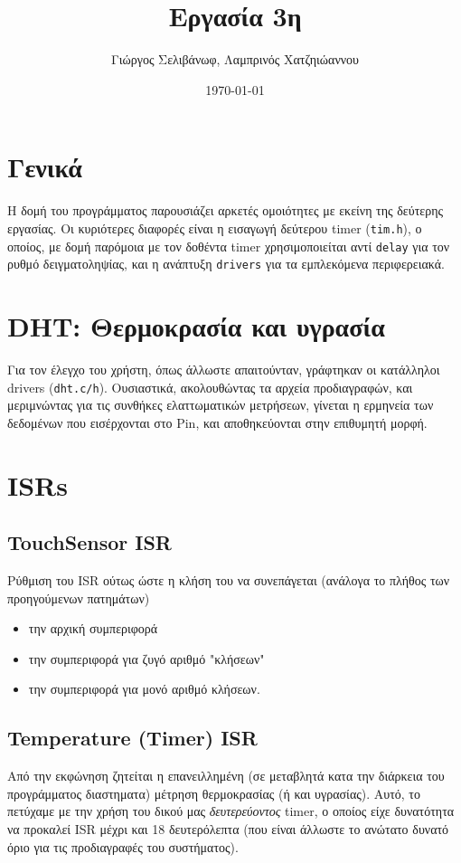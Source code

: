 \documentclass[11pt]{article}
\author{Γιώργος Σελιβάνωφ, Λαμπρινός Χατζηιώαννου}
\date{\today}
\title{Εργασία 3η}
\begin{document}
\maketitle
\section{Γενικά}
\label{sec:org1d7ea7e}
Η δομή του προγράμματος παρουσιάζει αρκετές ομοιότητες με εκείνη της
δεύτερης εργασίας. Οι κυριότερες διαφορές είναι η εισαγωγή δεύτερου
timer (\texttt{tim.h}), ο οποίος, με δομή παρόμοια με τον δοθέντα timer
χρησιμοποιείται αντί \texttt{delay} για τον ρυθμό δειγματοληψίας, και η
ανάπτυξη \texttt{drivers} για τα εμπλεκόμενα περιφερειακά.
\section{DHT: Θερμοκρασία και υγρασία}
\label{sec:org25f0554}
Για τον έλεγχο του χρήστη, όπως άλλωστε απαιτούνταν, γράφτηκαν οι
κατάλληλοι drivers (\texttt{dht.c/h}).  Ουσιαστικά, ακολουθώντας τα αρχεία
προδιαγραφών, και μεριμνώντας για τις συνθήκες ελαττωματικών
μετρήσεων, γίνεται η ερμηνεία των δεδομένων που εισέρχονται στο Pin,
και αποθηκεύονται στην επιθυμητή μορφή.
\section{ISRs}
\label{sec:org81a3a92}
\subsection{TouchSensor ISR}
\label{sec:orga41356c}
Ρύθμιση του ISR ούτως ώστε η κλήση του να συνεπάγεται (ανάλογα το
πλήθος των προηγούμενων πατημάτων)
\begin{itemize}
\item την αρχική συμπεριφορά
\item την συμπεριφορά για ζυγό αριθμό "κλήσεων"
\item την συμπεριφορά για μονό αριθμό κλήσεων.
\end{itemize}
\subsection{Temperature (Timer) ISR}
\label{sec:org4ea5fde}
Από την εκφώνηση ζητείται η επανειλλημένη (σε μεταβλητά κατα την
διάρκεια του προγράμματος διαστηματα) μέτρηση θερμοκρασίας (ή και
υγρασίας). Αυτό, το πετύχαμε με την χρήση του δικού μας \emph{δευτερεύοντος}
timer, ο οποίος είχε δυνατότητα να προκαλεί ISR μέχρι και 18
δευτερόλεπτα (που είναι άλλωστε το ανώτατο δυνατό όριο για τις
προδιαγραφές του συστήματος). 
\end{document}
